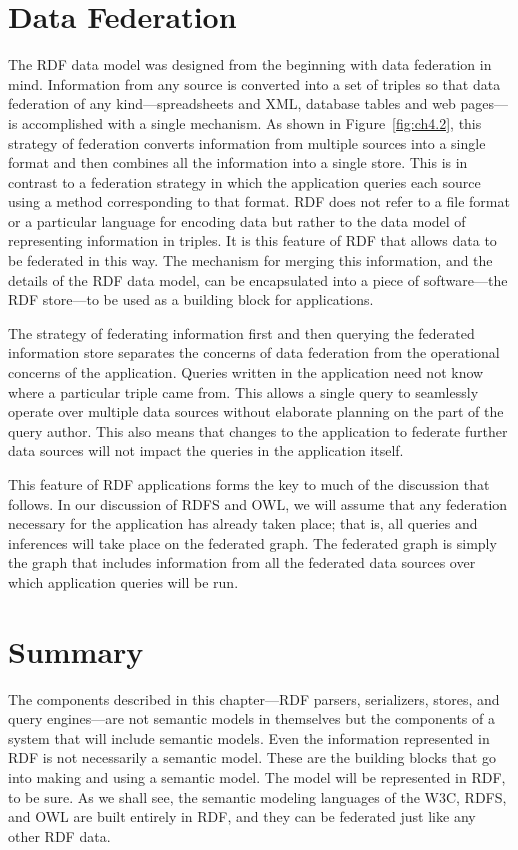 \section{Data Federation}

The RDF data model was designed from the beginning with data federation
in mind. Information from any source is converted into a set of triples
so that data federation of any kind---spreadsheets and XML, database
tables and web pages---is accomplished with a single mechanism. As shown
in Figure~\ref{fig:ch4.2},
this strategy of federation converts information from multiple sources
into a single format and then combines all the information into a single
store. This is in contrast to a federation strategy in which the
application queries each source using a method corresponding to that
format. RDF does not refer to a file format or a particular language for
encoding data but rather to the data model of representing information
in triples. It is this feature of RDF that allows data to be federated
in this way. The mechanism for merging this information, and the details
of the RDF data model, can be encapsulated into a piece of
software---the RDF store---to be used as a building block for
applications.

The strategy of federating information first and then querying the
federated information store separates the concerns of data federation
from the operational concerns of the application. Queries written in the
application need not know where a particular triple came from. This
allows a single query to seamlessly operate over multiple data sources
without elaborate planning on the part of the query author. This also
means that changes to the application to federate further data sources
will not impact the queries in the application itself.

This feature of RDF applications forms the key to much of the discussion
that follows. In our discussion of RDFS and OWL, we will assume that any
federation necessary for the application has already taken place; that
is, all queries and inferences will take place on the federated graph.
The federated graph is simply the graph that includes information from
all the federated data sources over which application queries will be
run.

\section{Summary}

The components described in this chapter---RDF parsers, serializers,
stores, and query engines---are not semantic models in themselves but
the components of a system that will include semantic models. Even the
information represented in RDF is not necessarily a semantic model.
These are the building blocks that go into making and using a semantic
model. The model will be represented in RDF, to be sure. As we shall
see, the semantic modeling languages of the W3C, RDFS, and OWL are built
entirely in RDF, and they can be federated just like any other RDF data.

